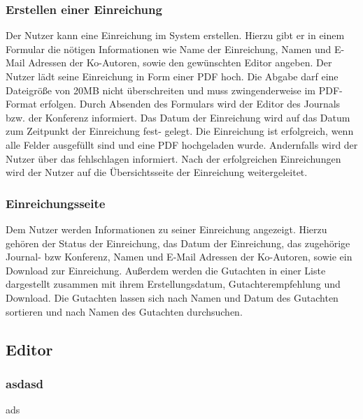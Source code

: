\subsubsection{Erstellen einer Einreichung}
\begin{description}
    \XXitem{} Der Nutzer kann eine Einreichung im System erstellen. Hierzu gibt er in einem
    Formular die nötigen Informationen wie Name der Einreichung, Namen und E-Mail Adressen der Ko-Autoren,
    sowie den gewünschten Editor angeben.
    \XXitem{} Der Nutzer lädt seine Einreichung in Form einer PDF hoch. Die Abgabe darf eine Dateigröße
    von 20MB nicht überschreiten und muss zwingenderweise im PDF-Format erfolgen.
    \XXitem{} Durch Absenden des Formulars wird der Editor des Journals bzw. der Konferenz
    informiert. Das Datum der Einreichung wird auf das Datum zum Zeitpunkt der Einreichung fest-
    gelegt.
    \XXitem{} Die Einreichung ist erfolgreich, wenn alle Felder ausgefüllt sind und eine PDF
    hochgeladen wurde. Andernfalls wird der Nutzer über das fehlschlagen informiert.
    \XXitem{} Nach der erfolgreichen Einreichungen wird der Nutzer auf die Übersichtsseite der
    Einreichung weitergeleitet.
\end{description}

\subsubsection{Einreichungsseite}
\begin{description}
     Dem Nutzer werden Informationen zu seiner Einreichung angezeigt.
    Hierzu gehören der Status der Einreichung, das Datum der Einreichung, das zugehörige
    Journal- bzw Konferenz, Namen und E-Mail Adressen der Ko-Autoren, sowie ein Download zur Einreichung.
    Außerdem werden die Gutachten in einer
    Liste dargestellt zusammen mit ihrem Erstellungsdatum, Gutachterempfehlung und Download. %
    \XXitem{} Die Gutachten lassen sich nach Namen und Datum
    des Gutachten sortieren und nach Namen des Gutachten durchsuchen. %
\end{description}

\subsection{Editor}
\subsubsection{asdasd} ads

